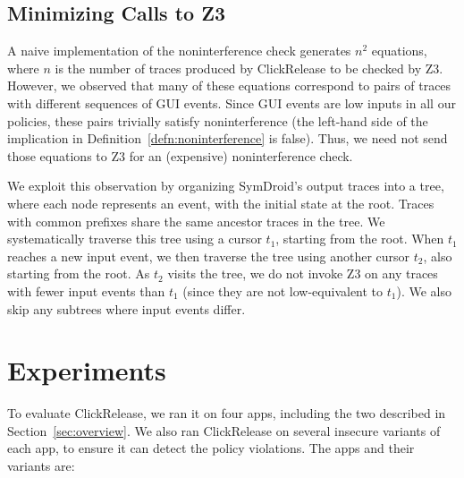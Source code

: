 \documentclass{llncs}
\newcommand{\toolname}{ClickRelease\xspace}
\begin{document}
\subsection{Minimizing Calls to Z3}
\label{sec:z3-tree}

A naive implementation of the noninterference check generates $n^2$
equations, where $n$ is the number of traces produced by \toolname{}
to be checked by Z3. However, we observed that many of these equations
correspond to pairs of traces with different sequences of GUI
events. Since GUI events are low inputs in all our policies, these
pairs trivially satisfy noninterference (the left-hand side of the
implication in Definition~\ref{defn:noninterference} is false).
Thus, we need not send those
equations to Z3 for an (expensive) noninterference check.

We exploit this observation by organizing SymDroid's output traces
into a tree, where each node represents an event, with
the initial state at the root. Traces with common prefixes share the
same ancestor traces in the tree. We systematically traverse this tree
using a cursor $t_1$, starting from the root. When $t_1$ reaches a new
input event, we then traverse the tree using another cursor $t_2$,
also starting from the root. As $t_2$ visits the tree, we do not
invoke Z3 on any traces with fewer input events than $t_1$ (since they
are not low-equivalent to $t_1$). We also skip any subtrees where 
input events differ.

\section{Experiments}
\label{sec:experiments}

To evaluate \toolname{}, we ran it on four apps, including the two
described in Section~\ref{sec:overview}. We also ran \toolname{} on
several insecure variants of each app, to ensure it can detect the
policy violations. The apps and their variants
are:
\end{document}
